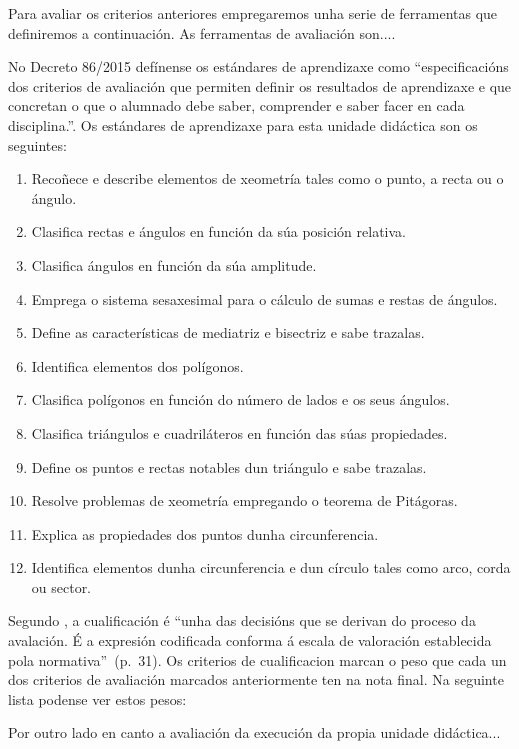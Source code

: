 Para avaliar os criterios anteriores empregaremos unha serie de ferramentas que definiremos a continuación. As ferramentas de avaliación son....

No Decreto 86/2015 defínense os estándares de aprendizaxe como ``especificacións dos criterios de avaliación que permiten definir os resultados de aprendizaxe e que concretan o que o alumnado debe saber, comprender e saber facer en cada disciplina.''. Os estándares de aprendizaxe para esta unidade didáctica son os seguintes:

\begin{enumerate}[label=\bfseries Est\arabic*]
 \item\label{est1} Recoñece e describe elementos de xeometría tales como o punto, a recta ou o ángulo.
 \item\label{est2} Clasifica rectas e ángulos en función da súa posición relativa.
 \item\label{est3} Clasifica ángulos en función da súa amplitude.
 \item\label{est4} Emprega o sistema sesaxesimal para o cálculo de sumas e restas de ángulos.
 \item\label{est5} Define as características de mediatriz e bisectriz e sabe trazalas.
 \item\label{est6} Identifica elementos dos polígonos.
 \item\label{est7} Clasifica polígonos en función do número de lados e os seus ángulos.
 \item\label{est8} Clasifica triángulos e cuadriláteros en función das súas propiedades.
 \item\label{est9} Define os puntos e rectas notables dun triángulo e sabe trazalas.
 \item\label{est10} Resolve problemas de xeometría empregando o teorema de Pitágoras.
 \item\label{est11} Explica as propiedades dos puntos dunha circunferencia.
 \item\label{est12} Identifica elementos dunha circunferencia e dun círculo tales como arco, corda ou sector.
\end{enumerate}

Segundo \cite{orientacionesgobvasco}, a cualificación é ``unha das decisións que se derivan do proceso da avalación. É a expresión codificada conforma á escala de valoración establecida pola normativa''~(p.~31). Os criterios de cualificacion marcan o peso que cada un dos criterios de avaliación marcados anteriormente ten na nota final. Na seguinte lista podense ver estos pesos:

Por outro lado en canto a avaliación da execución da propia unidade didáctica...
